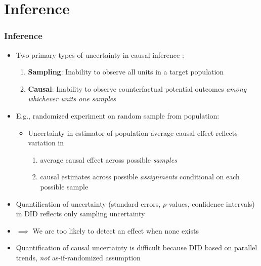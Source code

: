\documentclass[table, xcolor = {dvipsnames}, 9pt]{beamer}
\theoremstyle{plain}
\begin{document}
\section{Inference}
\begin{frame}[t]
\frametitle{Inference}
\vfill 
\begin{itemize}
\item Two primary types of uncertainty in causal inference \citep{abadieetal2020}: \vfill
\begin{enumerate}
\item \pause \textbf{Sampling}: \pause Inability to observe all units in a target population \vfill
\item \pause \textbf{Causal}: \pause Inability to observe counterfactual potential outcomes \textit{among whichever units one samples}  \vfill
\end{enumerate}
\item \pause E.g., randomized experiment on random sample from population: \vfill
\begin{itemize}
\item \pause Uncertainty in estimator of population average causal effect reflects variation in \vfill
\begin{enumerate}
\item \pause average causal effect across possible \textit{samples} \vfill
\item \pause causal estimates across possible \textit{assignments} conditional on each possible sample \vfill
\end{enumerate} 
\end{itemize}
\item \pause Quantification of uncertainty (standard errors, $p$-values, confidence intervals) in DID reflects only sampling uncertainty \vfill
\item[] \pause $\implies$ We are too likely to detect an effect when none exists \vfill
\item \pause Quantification of causal uncertainty is difficult because DID based on parallel trends, \textit{not} as-if-randomized assumption \\ 
\citep{manskipepper2018} \vfill
\end{itemize}
\vfill
\end{frame}
\end{document}
